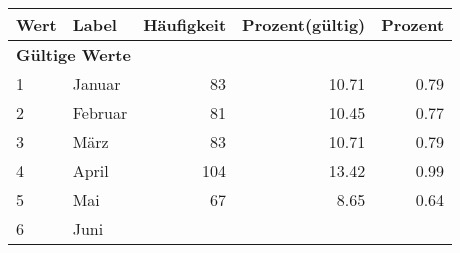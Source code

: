      \begin{longtable}{lXrrr}
     \toprule
     \textbf{Wert} & \textbf{Label} & \textbf{Häufigkeit} & \textbf{Prozent(gültig)} & \textbf{Prozent} \\
     \endhead
     \midrule
     \multicolumn{5}{l}{\textbf{Gültige Werte}}\\

     1 &
     \multicolumn{1}{X}{ Januar   } &


       \num{83} &
       \num[round-mode=places,round-precision=2]{10.71} &
         \num[round-mode=places,round-precision=2]{0.79} \\

     2 &
     \multicolumn{1}{X}{ Februar   } &


       \num{81} &
       \num[round-mode=places,round-precision=2]{10.45} &
         \num[round-mode=places,round-precision=2]{0.77} \\

     3 &
     \multicolumn{1}{X}{ März   } &


       \num{83} &
       \num[round-mode=places,round-precision=2]{10.71} &
         \num[round-mode=places,round-precision=2]{0.79} \\

     4 &
     \multicolumn{1}{X}{ April   } &


       \num{104} &
       \num[round-mode=places,round-precision=2]{13.42} &
         \num[round-mode=places,round-precision=2]{0.99} \\

     5 &
     \multicolumn{1}{X}{ Mai   } &


       \num{67} &
       \num[round-mode=places,round-precision=2]{8.65} &
         \num[round-mode=places,round-precision=2]{0.64} \\

     6 &
     \multicolumn{1}{X}{ Juni   } &



\end{longtable}
